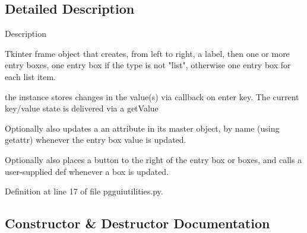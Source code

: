 \subsection{Detailed Description}
\begin{DoxyVerb}Description

Tkinter frame object that creates,
from left to right, a label, then 
one or more entry boxes, one entry box 
if the type is not "list", otherwise one 
entry box for each list item.

the instance stores changes in the value(s)
via callback on enter key.  The current
key/value state is delivered via a getValue


Optionally also updates a an attribute
in its master object, by name (using getattr)
whenever the entry box value is updated.

Optionally also places a button to the right
of the entry box or boxes, and calls a user-supplied
def whenever a box is updated.\end{DoxyVerb}
 

Definition at line 17 of file pgguiutilities.\+py.



\subsection{Constructor \& Destructor Documentation}
